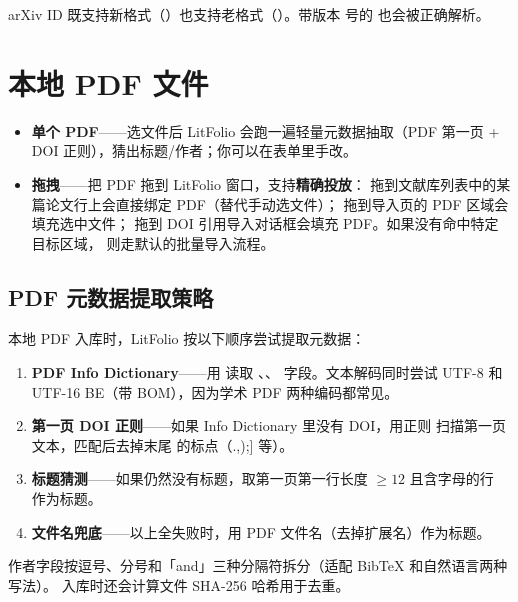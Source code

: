 \begin{tipbox}
arXiv ID 既支持新格式（）也支持老格式（）。带版本
号的  也会被正确解析。
\end{tipbox}

\section{本地 PDF 文件}


\begin{itemize}
  \item \textbf{单个 PDF}——选文件后 LitFolio 会跑一遍轻量元数据抽取（PDF 第一页 +
    DOI 正则），猜出标题/作者；你可以在表单里手改。
  \item \textbf{拖拽}——把 PDF 拖到 LitFolio 窗口，支持\textbf{精确投放}：
    拖到文献库列表中的某篇论文行上会直接绑定 PDF（替代手动选文件）；
    拖到导入页的 PDF 区域会填充选中文件；
    拖到 DOI 引用导入对话框会填充 PDF。如果没有命中特定目标区域，
    则走默认的批量导入流程。
\end{itemize}

\subsection{PDF 元数据提取策略}

本地 PDF 入库时，LitFolio 按以下顺序尝试提取元数据：

\begin{enumerate}
  \item \textbf{PDF Info Dictionary}——用  读取 、、
     字段。文本解码同时尝试 UTF-8 和 UTF-16 BE（带 BOM），因为学术 PDF
    两种编码都常见。
  \item \textbf{第一页 DOI 正则}——如果 Info Dictionary 里没有 DOI，用正则
     扫描第一页文本，匹配后去掉末尾
    的标点（.,);] 等）。
  \item \textbf{标题猜测}——如果仍然没有标题，取第一页第一行长度 $\geq 12$ 且含字母的行
    作为标题。
  \item \textbf{文件名兜底}——以上全失败时，用 PDF 文件名（去掉扩展名）作为标题。
\end{enumerate}

作者字段按逗号、分号和「and」三种分隔符拆分（适配 BibTeX 和自然语言两种写法）。
入库时还会计算文件 SHA-256 哈希用于去重。

